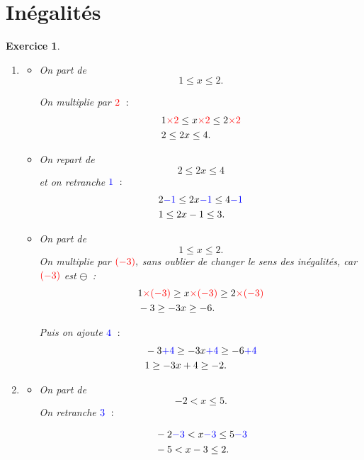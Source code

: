 \documentclass[10pt]{article}
\newtheorem{exo}{Exercice}
\begin{document}
\section{Inégalités}

\begin{exo}

\begin{enumerate}
\item \begin{itemize}
\item[\textbullet] On part de \[1\leq x\leq 2.\]

On multiplie par $\textcolor{red}{2}~:$
\begin{align*}
&1 \textcolor{red}{\times 2}\leq x \textcolor{red}{\times 2}\leq 2 \textcolor{red}{\times 2}\\
&2\leq 2x\leq 4.\end{align*}
\item[\textbullet] On repart de \[2\leq 2x\leq 4\] et on retranche $\textcolor{blue}{1}~:$
\begin{align*}
&2\textcolor{blue}{-1}\leq 2x\textcolor{blue}{-1}\leq 4\textcolor{blue}{-1}\\
&1\leq 2x-1\leq 3.
\end{align*}
\item[\textbullet] On part de \[1\leq x\leq 2.\] On multiplie par $\textcolor{red}{(-3)},$ \danger sans oublier de changer le sens des inégalités, car $\textcolor{red}{(-3)}$ est \Large$\ominus$\normalsize~:
\begin{align*}
&1\textcolor{red}{\times (-3)}\geq x\textcolor{red}{\times (-3)}\geq 2\textcolor{red}{\times (-3)}\\
&-3\geq -3x\geq -6.\end{align*}

Puis on ajoute $\textcolor{blue}{4}~:$
\begin{align*}
&-3\textcolor{blue}{+4}\geq -3x\textcolor{blue}{+4}\geq -6\textcolor{blue}{+4}\\
&1\geq -3x+4\geq -2.\end{align*}
\end{itemize}
\item 
\begin{itemize}
\item[\textbullet] On part de \[-2<x\leq 5.\] On retranche $\textcolor{blue}{3}~:$

\begin{align*}
&-2\textcolor{blue}{-3}< x\textcolor{blue}{-3}\leq 5\textcolor{blue}{-3}\\
&-5< x-3\leq 2.\end{align*}


\end{itemize}
\end{enumerate}
\end{exo}
\end{document}
